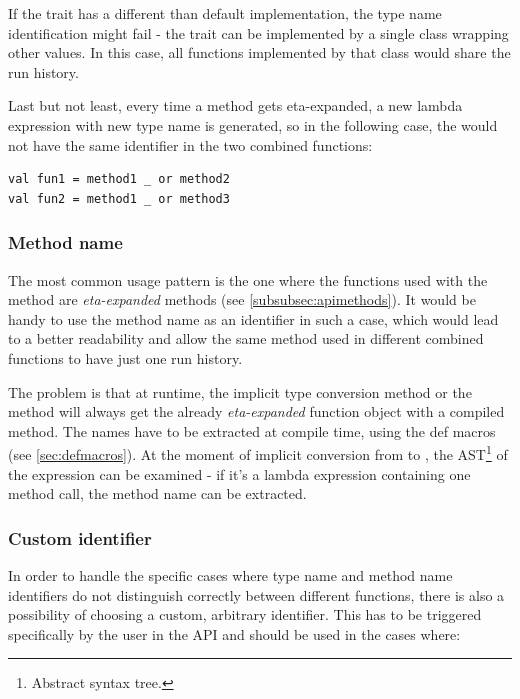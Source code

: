 If the  trait has a different than default implementation, the type name identification might fail - the trait can be implemented by a single class wrapping other values. In this case, all functions implemented by that class would share the run history.

Last but not least, every time a method gets eta-expanded, a new lambda expression with new type name is generated, so in the following case, the  would not have the same identifier in the two combined functions:

\lstset{style=Scala}
\begin{lstlisting}
val fun1 = method1 _ or method2
val fun2 = method1 _ or method3
\end{lstlisting}

\subsubsection{Method name}
\label{subsec:methodnameident}

The most common usage pattern is the one where the functions used with the  method are \textit{eta-expanded} methods (see \ref{subsubsec:apimethods}). It would be handy to use the method name as an identifier in such a case, which would lead to a better readability and allow the same method used in different combined functions to have just one run history.

The problem is that at runtime, the implicit type conversion method or the  method will always get the already \textit{eta-expanded} function object with a compiled  method. The names have to be extracted at compile time, using the def macros (see \ref{sec:defmacros}). At the moment of implicit conversion from  to , the AST\footnote{Abstract syntax tree.} of the  expression can be examined - if it's a lambda expression containing one method call, the method name can be extracted.

\subsubsection{Custom identifier}
\label{subsubsec:custom_identifier}

In order to handle the specific cases where type name and method name identifiers do not distinguish correctly between different functions, there is also a possibility of choosing a custom, arbitrary identifier. This has to be triggered specifically by the user in the API and should be used in the cases where:

